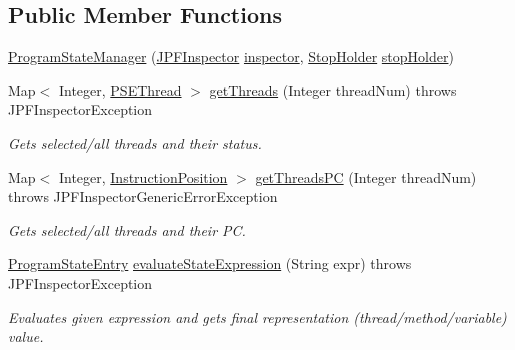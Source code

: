 \subsection*{Public Member Functions}
\begin{DoxyCompactItemize}
\item 
\hyperlink{classgov_1_1nasa_1_1jpf_1_1inspector_1_1server_1_1programstate_1_1_program_state_manager_a70ea31e127e3b0ad80859ffb23760b2d}{Program\+State\+Manager} (\hyperlink{classgov_1_1nasa_1_1jpf_1_1inspector_1_1server_1_1jpf_1_1_j_p_f_inspector}{J\+P\+F\+Inspector} \hyperlink{classgov_1_1nasa_1_1jpf_1_1inspector_1_1server_1_1programstate_1_1_program_state_manager_a7f6b466bef8fa70a70390311e477f942}{inspector}, \hyperlink{classgov_1_1nasa_1_1jpf_1_1inspector_1_1server_1_1jpf_1_1_stop_holder}{Stop\+Holder} \hyperlink{classgov_1_1nasa_1_1jpf_1_1inspector_1_1server_1_1programstate_1_1_program_state_manager_a81892c2dbe16ef208fdd688bc0ff7c8f}{stop\+Holder})
\item 
Map$<$ Integer, \hyperlink{classgov_1_1nasa_1_1jpf_1_1inspector_1_1common_1_1pse_1_1_p_s_e_thread}{P\+S\+E\+Thread} $>$ \hyperlink{classgov_1_1nasa_1_1jpf_1_1inspector_1_1server_1_1programstate_1_1_program_state_manager_a8b8176020262b508cc861dc411911ce3}{get\+Threads} (Integer thread\+Num)  throws J\+P\+F\+Inspector\+Exception 
\begin{DoxyCompactList}\small\item\em Gets selected/all threads and their status. \end{DoxyCompactList}\item 
Map$<$ Integer, \hyperlink{interfacegov_1_1nasa_1_1jpf_1_1inspector_1_1interfaces_1_1_instruction_position}{Instruction\+Position} $>$ \hyperlink{classgov_1_1nasa_1_1jpf_1_1inspector_1_1server_1_1programstate_1_1_program_state_manager_a6da8c46fe7b0c51f6c93aabf4e2c12ca}{get\+Threads\+PC} (Integer thread\+Num)  throws J\+P\+F\+Inspector\+Generic\+Error\+Exception 
\begin{DoxyCompactList}\small\item\em Gets selected/all threads and their PC. \end{DoxyCompactList}\item 
\hyperlink{classgov_1_1nasa_1_1jpf_1_1inspector_1_1common_1_1pse_1_1_program_state_entry}{Program\+State\+Entry} \hyperlink{classgov_1_1nasa_1_1jpf_1_1inspector_1_1server_1_1programstate_1_1_program_state_manager_aafa2d8336ed4229843f36fe99897be71}{evaluate\+State\+Expression} (String expr)  throws J\+P\+F\+Inspector\+Exception 
\begin{DoxyCompactList}\small\item\em Evaluates given expression and gets final representation (thread/method/variable) value. \end{DoxyCompactList}\item 

\end{DoxyCompactItemize}
